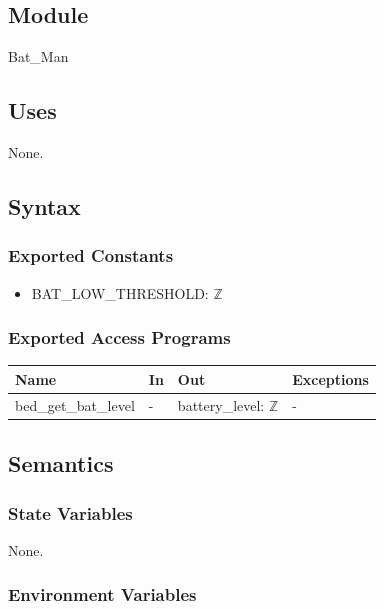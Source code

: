 \documentclass[12pt, titlepage]{article}
\begin{document}
\subsection{Module}

Bat\_Man

\subsection{Uses}

None.

\subsection{Syntax}

\subsubsection{Exported Constants}
\begin{itemize}
\item BAT\_LOW\_THRESHOLD: $\mathbb{Z}$
\end{itemize}

\subsubsection{Exported Access Programs}

\begin{center}
\begin{tabular}{p{4cm} p{4cm} p{3cm} p{4cm}}
\hline
\textbf{Name} & \textbf{In} & \textbf{Out} & \textbf{Exceptions} \\
\hline
bed\_get\_bat\_level & - & battery\_level: $\mathbb{Z}$ & -\\
\hline
\end{tabular}
\end{center}

\subsection{Semantics}

\subsubsection{State Variables}

None.

\subsubsection{Environment Variables}
\end{document}
